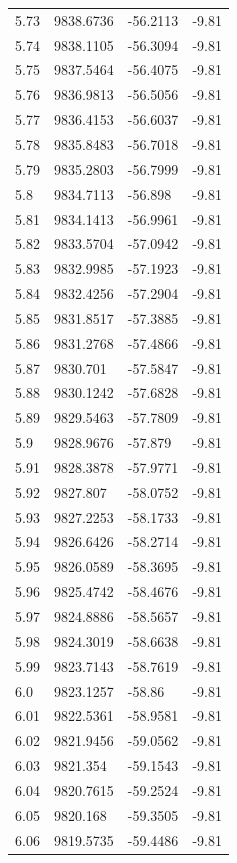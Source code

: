 \begin{table}[H]
\begin{tabular}{llll}
5.73 & 9838.6736 & -56.2113 & -9.81 \\
5.74 & 9838.1105 & -56.3094 & -9.81 \\
5.75 & 9837.5464 & -56.4075 & -9.81 \\
5.76 & 9836.9813 & -56.5056 & -9.81 \\
5.77 & 9836.4153 & -56.6037 & -9.81 \\
5.78 & 9835.8483 & -56.7018 & -9.81 \\
5.79 & 9835.2803 & -56.7999 & -9.81 \\
5.8 & 9834.7113 & -56.898 & -9.81 \\
5.81 & 9834.1413 & -56.9961 & -9.81 \\
5.82 & 9833.5704 & -57.0942 & -9.81 \\
5.83 & 9832.9985 & -57.1923 & -9.81 \\
5.84 & 9832.4256 & -57.2904 & -9.81 \\
5.85 & 9831.8517 & -57.3885 & -9.81 \\
5.86 & 9831.2768 & -57.4866 & -9.81 \\
5.87 & 9830.701 & -57.5847 & -9.81 \\
5.88 & 9830.1242 & -57.6828 & -9.81 \\
5.89 & 9829.5463 & -57.7809 & -9.81 \\
5.9 & 9828.9676 & -57.879 & -9.81 \\
5.91 & 9828.3878 & -57.9771 & -9.81 \\
5.92 & 9827.807 & -58.0752 & -9.81 \\
5.93 & 9827.2253 & -58.1733 & -9.81 \\
5.94 & 9826.6426 & -58.2714 & -9.81 \\
5.95 & 9826.0589 & -58.3695 & -9.81 \\
5.96 & 9825.4742 & -58.4676 & -9.81 \\
5.97 & 9824.8886 & -58.5657 & -9.81 \\
5.98 & 9824.3019 & -58.6638 & -9.81 \\
5.99 & 9823.7143 & -58.7619 & -9.81 \\
6.0 & 9823.1257 & -58.86 & -9.81 \\
6.01 & 9822.5361 & -58.9581 & -9.81 \\
6.02 & 9821.9456 & -59.0562 & -9.81 \\
6.03 & 9821.354 & -59.1543 & -9.81 \\
6.04 & 9820.7615 & -59.2524 & -9.81 \\
6.05 & 9820.168 & -59.3505 & -9.81 \\
6.06 & 9819.5735 & -59.4486 & -9.81 \\

\end{tabular}
\end{table}
